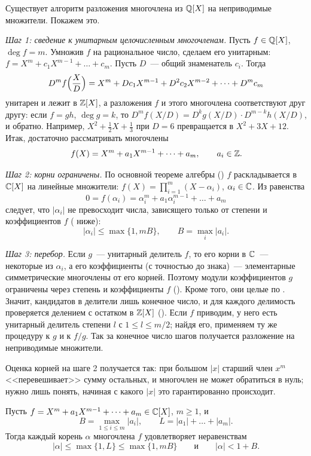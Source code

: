 \begin{remark}[1.17]
Существует алгоритм разложения многочлена из $\mathbb Q[X]$ на неприводимые множители. Покажем это.

\emph{Шаг 1: сведение к унитарным целочисленным многочленам.} Пусть $f\in\mathbb Q[X]$, $\deg f=m$. Умножив $f$ на рациональное
число, сделаем его унитарным: $f=X^m+c_1X^{m-1}+\dots+c_m$. Пусть $D$~--- общий знаменатель $c_i$. Тогда
\[
D^mf\Bigl(\frac XD\Bigr)=X^m+Dc_1X^{m-1}+D^2c_2X^{m-2}+\dots+D^mc_m
\]
унитарен и лежит в $\mathbb Z[X]$, а разложения $f$ и этого многочлена соответствуют друг другу: если $f=gh$, $\deg g=k$, то
$D^mf(X/D)=D^kg(X/D)\cdot D^{m-k}h(X/D)$, и обратно. Например, $X^2+\frac12X+\frac13$ при $D=6$ превращается в
$X^2+3X+12$. Итак, достаточно рассматривать многочлены
\[
f(X)=X^m+a_1X^{m-1}+\dots+a_m,\qquad a_i\in\mathbb Z .
\]

\emph{Шаг 2: корни ограничены.} По основной теореме алгебры () $f$ раскладывается в $\mathbb C[X]$ на линейные множители:
$f(X)=\prod_{i=1}^m(X-\alpha_i)$, $\alpha_i\in\mathbb C$. Из равенства
\[
0=f(\alpha_i)=\alpha_i^m+a_1\alpha_i^{m-1}+\dots+a_m
\]
следует, что $|\alpha_i|$ не превосходит числа, зависящего только от степени и коэффициентов $f$ ( ниже):
\[
|\alpha_i|\le\max\{1,mB\},\qquad B=\max_i|a_i| .
\]

\emph{Шаг 3: перебор.} Если $g$~--- унитарный делитель $f$, то его корни в $\mathbb C$~--- некоторые из $\alpha_i$, а его
коэффициенты (с точностью до знака)~--- элементарные симметрические многочлены от его корней. Поэтому модули
коэффициентов $g$ ограничены через степень и коэффициенты $f$ (). Кроме того, они целые по . Значит,
кандидатов в делители лишь конечное число, и для каждого делимость проверяется делением с остатком в $\mathbb Z[X]$ ().
Если $f$ приводим, у него есть унитарный делитель степени $l$ с $1\le l\le m/2$; найдя его, применяем ту же процедуру
к $g$ и к $f/g$. Так за конечное число шагов получается разложение на неприводимые множители.
\end{remark}

Оценка корней на шаге 2 получается так: при большом $|x|$ старший член $x^m$ <<перевешивает>> сумму остальных, и многочлен
не может обратиться в нуль; нужно лишь понять, начиная с какого $|x|$ это гарантированно происходит.

\begin{proposition}
Пусть $f=X^m+a_1X^{m-1}+\dots+a_m\in\mathbb C[X]$, $m\ge1$, и
\[
B=\max_{1\le i\le m}|a_i|,\qquad L=|a_1|+\dots+|a_m| .
\]
Тогда каждый корень $\alpha$ многочлена $f$ удовлетворяет неравенствам
\[
|\alpha|\le\max\{1,L\}\le\max\{1,mB\}\qquad\text{и}\qquad|\alpha|<1+B .
\]
\end{proposition}

